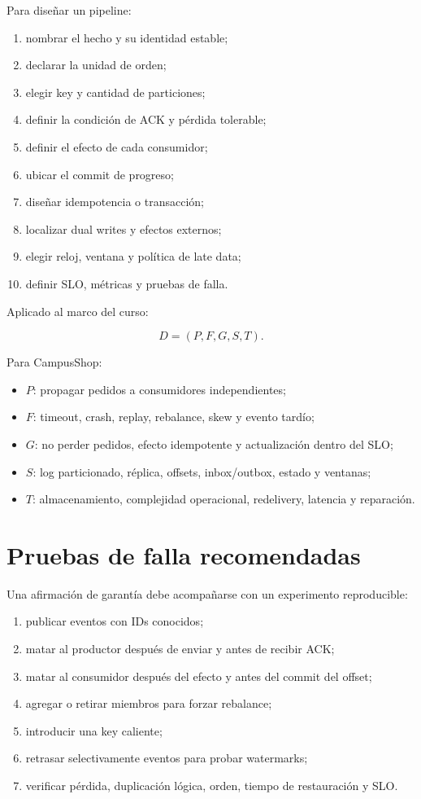 \documentclass[variant=apuntes,cover=institutional,mode=screen]{ua-engineering-v6-article}
\begin{document}
Para diseñar un pipeline:

\begin{enumerate}
\item nombrar el hecho y su identidad estable;
\item declarar la unidad de orden;
\item elegir key y cantidad de particiones;
\item definir la condición de ACK y pérdida tolerable;
\item definir el efecto de cada consumidor;
\item ubicar el commit de progreso;
\item diseñar idempotencia o transacción;
\item localizar dual writes y efectos externos;
\item elegir reloj, ventana y política de late data;
\item definir SLO, métricas y pruebas de falla.
\end{enumerate}

Aplicado al marco del curso:

\[
D=(P,F,G,S,T).
\]

Para CampusShop:

\begin{itemize}
\item $P$: propagar pedidos a consumidores independientes;
\item $F$: timeout, crash, replay, rebalance, skew y evento tardío;
\item $G$: no perder pedidos, efecto idempotente y actualización dentro del SLO;
\item $S$: log particionado, réplica, offsets, inbox/outbox, estado y ventanas;
\item $T$: almacenamiento, complejidad operacional, redelivery, latencia y reparación.
\end{itemize}

\section{Pruebas de falla recomendadas}

Una afirmación de garantía debe acompañarse con un experimento reproducible:

\begin{enumerate}
\item publicar eventos con IDs conocidos;
\item matar al productor después de enviar y antes de recibir ACK;
\item matar al consumidor después del efecto y antes del commit del offset;
\item agregar o retirar miembros para forzar rebalance;
\item introducir una key caliente;
\item retrasar selectivamente eventos para probar watermarks;
\item verificar pérdida, duplicación lógica, orden, tiempo de restauración y SLO.
\end{enumerate}
\end{document}
